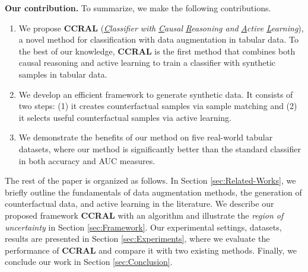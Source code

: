 \textbf{Our contribution.} To summarize, we make the following contributions.
\begin{enumerate}
\item We propose \textbf{CCRAL} (\textit{\uline{C}}\textit{lassifier
with }\textit{\uline{C}}\textit{ausal }\textit{\uline{R}}\textit{easoning
and }\textit{\uline{A}}\textit{ctive }\textit{\uline{L}}\textit{earning}),
a novel method for classification with data augmentation in tabular
data. To the best of our knowledge, \textbf{CCRAL} is the first method
that combines both causal reasoning and active learning to train a
classifier with synthetic samples in tabular data.
\item We develop an efficient framework to generate synthetic data. It consists
of two steps: (1) it creates counterfactual samples via sample matching
and (2) it selects useful counterfactual samples via active learning.
\item We demonstrate the benefits of our method on five real-world tabular
datasets, where our method is significantly better than the standard
classifier in both accuracy and AUC measures.
\end{enumerate}
The rest of the paper is organized as follows. In Section \ref{sec:Related-Works},
we briefly outline the fundamentals of data augmentation methods,
the generation of counterfactual data, and active learning in the
literature. We describe our proposed framework \textbf{CCRAL} with
an algorithm and illustrate the \textit{region of uncertainty} in
Section \ref{sec:Framework}. Our experimental settings, datasets,
results are presented in Section \ref{sec:Experiments}, where we
evaluate the performance of \textbf{CCRAL} and compare it with two
existing methods. Finally, we conclude our work in Section \ref{sec:Conclusion}.
